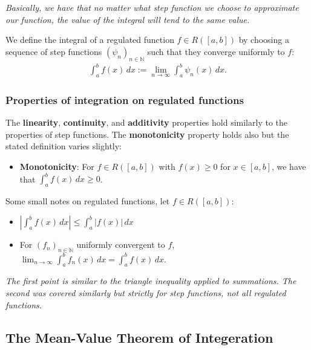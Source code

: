 \documentclass[a4paper, 12pt, twoside]{article}
\begin{document}
\textit{Basically, we have that no matter what step function we choose to
      approximate our function, the value of the integral will tend to the same
      value.}

\vspace{\baselineskip}

We define the integral of a regulated function $f \in R([a, b])$ by choosing
a sequence of step functions $(\psi_n)_{n\in\mathbb{N}}$ such that they
converge uniformly to $f$:
\begin{align*}
      \int_a^b f(x) \, dx := \lim_{n\to\infty} \int_a^b \psi_n(x) \, dx.
\end{align*}

\subsubsection{Properties of integration on regulated functions}

The \textbf{linearity}, \textbf{continuity}, and \textbf{additivity} properties
hold similarly to the properties of step functions. The \textbf{monotonicity}
property holds also but the stated definition varies slightly:

\begin{itemize}
      \item \textbf{Monotonicity}: For $f \in R([a,b])$ with $f(x) \geq 0$
            for $x \in [a, b]$, we have that $\int_a^b f(x)\,dx \geq 0$.
\end{itemize}

Some small notes on regulated functions, let $f \in R([a, b])$:

\begin{itemize}
      \item $|\int_a^b f(x) \, dx| \leq \int_a^b |f(x)| \, dx$
      \item For $(f_n)_{n\in\mathbb{N}}$ uniformly convergent to $f$,
            $\lim_{n\to\infty}\int_a^b f_n(x) \, dx = \int_a^b f(x) \, dx$.
\end{itemize}

\textit{The first point is similar to the triangle inequality applied to
      summations. The second was covered similarly but strictly for step functions,
      not all regulated functions.}

\newpage

\subsection{The Mean-Value Theorem of Integeration}
\end{document}
